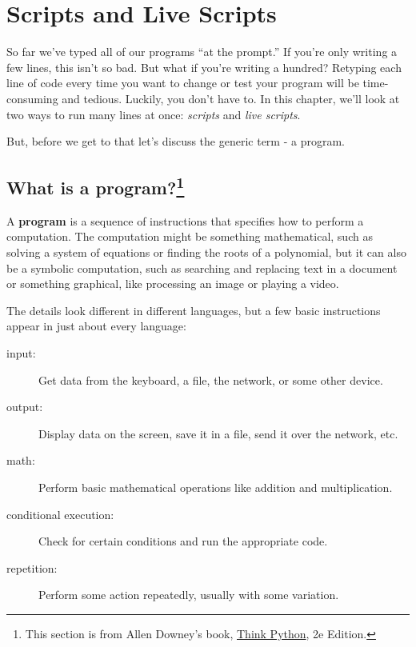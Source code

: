 \documentclass[../../book.tex]{subfiles}
\begin{document}
\chapter{Scripts and Live Scripts}

So far we've typed all of our programs ``at the prompt.'' If you're only writing a few lines, this isn't so bad. But what if you're writing a hundred? Retyping each line of code every time you want to change or test your program will be time-consuming and tedious. Luckily, you don't have to. In this chapter, we'll look at two ways to run many lines at once: \emph{scripts} and \emph{live scripts}.

But, before we get to that let's discuss the generic term - a program.

\section[What is a program?]{What is a program?\protect\footnote{This section is from Allen Downey's book, \href{https://greenteapress.com/wp/think-python-2e/}{Think Python}, 2e Edition.}}

A {\bf program} is a sequence of instructions that specifies how to
perform a computation.  The computation might be something
mathematical, such as solving a system of equations or finding the
roots of a polynomial, but it can also be a symbolic computation, such
as searching and replacing text in a document or something
graphical, like processing an image or playing a video.

The details look different in different languages, but a few basic
instructions appear in just about every language:

\begin{description}

\item[input:] Get data from the keyboard, a file, the network, or some
other device.

\item[output:] Display data on the screen, save it in a
file, send it over the network, etc.

\item[math:] Perform basic mathematical operations like addition and
multiplication.

\item[conditional execution:] Check for certain conditions and
run the appropriate code.

\item[repetition:] Perform some action repeatedly, usually with
some variation.

\end{description}
\end{document}
